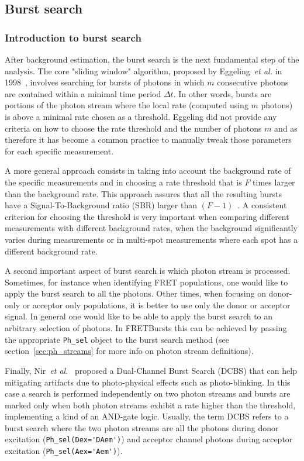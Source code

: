 \subsection{Burst search}
\label{sec:burstsearch}

\subsubsection{Introduction to burst search}
\label{sec:burstsearch_intro}

After background estimation, the burst search is the next fundamental step of
the analysis. The core "sliding window" algorithm, proposed by
Eggeling~\textit{et al.} in 1998~\cite{Eggeling_1998}, involves searching for
bursts of photons
in which $m$ consecutive photons are contained within a minimal time period
$\Delta t$. In other words, bursts are portions of the photon stream where the
local rate (computed using $m$ photons) is above a minimal rate chosen as a
threshold. Eggeling did not provide any criteria on how to choose the rate
threshold and the number of photons $m$ and as therefore it has become a common
practice to manually tweak those parameters for each specific measurement. 

A more general approach consists in taking into account the background rate of
the specific measurements and in choosing a rate threshold that is $F$ times
larger than the background rate. This approach assures that all the resulting bursts
have a Signal-To-Background ratio (SBR) larger than
$(F-1)$~\cite{Michalet_2012}. A consistent criterion for choosing the threshold is
very important when comparing different measurements with different background
rates, when the background significantly varies during measurements or in
multi-spot measurements where each spot has a different background rate.

A second important aspect of burst search is which photon stream is processed.
Sometimes, for instance when identifying FRET populations, one would like to
apply the burst search to all the photons. Other times, when focusing on
donor-only or acceptor only populations, it is better to use only the donor or
acceptor signal. In general one would like to be able to apply the burst search
to an arbitrary selection of photons. In FRETBursts this can be achieved by passing
the appropriate \verb|Ph_sel| object to the burst search method (see
section~\ref{sec:ph_streams} for more info on photon stream definitions).

Finally, Nir~\textit{et al.}~\cite{Nir_2006} proposed a Dual-Channel Burst
Search (DCBS) that can help mitigating artifacts due to
photo-physical effects such as photo-blinking. In this case a search is performed
independently on two photon streams and bursts are marked only when both photon
streams exhibit a rate higher than the threshold, 
implementing a kind of an AND-gate logic. 
Usually, the term DCBS refers to a burst search where the two photon streams
are all the photons 
during donor excitation (\verb|Ph_sel(Dex='DAem')|) and acceptor channel photons
during acceptor 
excitation (\verb|Ph_sel(Aex='Aem')|).

